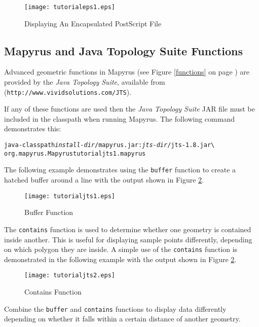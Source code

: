 

\begin{figure}[htb]
\texttt{[image: tutorialeps1.eps]}
\caption{Displaying An Encapsulated PostScript File}
\label{tutorialeps1}
\end{figure}

\subsection{Mapyrus and Java Topology Suite Functions}
\label{tutorialjts}

Advanced geometric functions in Mapyrus
(see Figure \ref{functions} on page \pageref{functions})
are provided by the
\textit{Java Topology Suite},
available from
(\texttt{http://www.vividsolutions.com/JTS}).

If any of these functions are used then the
\textit{Java Topology Suite} JAR file must be included in the
classpath when running Mapyrus.  The following command demonstrates this:

\begin{alltt}
java -classpath \textit{install-dir}/mapyrus.jar:\textit{jts-dir}/jts-1.8.jar \textbackslash
  org.mapyrus.Mapyrus tutorialjts1.mapyrus
\end{alltt}

The following example demonstrates using the \texttt{buffer} function to
create a hatched buffer around a line
with the output shown in Figure \ref{tutorialjts1}.



\begin{figure}[htb]
\texttt{[image: tutorialjts1.eps]}
\caption{Buffer Function}
\label{tutorialjts1}
\end{figure}

The \texttt{contains} function is used to determine whether one geometry
is contained inside another.  This is useful for displaying sample points
differently, depending on which polygon they are inside.
A simple use of the \texttt{contains} function is
demonstrated in the following example
with the output shown in Figure \ref{tutorialjts1}.



\begin{figure}[htb]
\texttt{[image: tutorialjts2.eps]}
\caption{Contains Function}
\label{tutorialjts2}
\end{figure}

Combine the \texttt{buffer} and \texttt{contains} functions to
display data differently depending on whether it falls within
a certain distance of another geometry.

